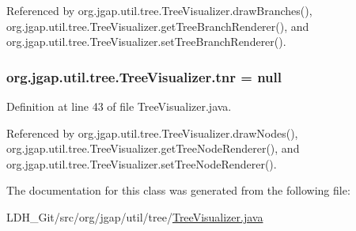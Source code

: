 Referenced by org.\-jgap.\-util.\-tree.\-Tree\-Visualizer.\-draw\-Branches(), org.\-jgap.\-util.\-tree.\-Tree\-Visualizer.\-get\-Tree\-Branch\-Renderer(), and org.\-jgap.\-util.\-tree.\-Tree\-Visualizer.\-set\-Tree\-Branch\-Renderer().

\hypertarget{classorg_1_1jgap_1_1util_1_1tree_1_1_tree_visualizer_a506cac5d7eb4e280016146f321b921fa}{
\subsubsection[{tnr}]{ org.\-jgap.\-util.\-tree.\-Tree\-Visualizer.\-tnr = null\hspace{0.3cm}{\ttfamily [private]}}}\label{classorg_1_1jgap_1_1util_1_1tree_1_1_tree_visualizer_a506cac5d7eb4e280016146f321b921fa}


Definition at line 43 of file Tree\-Visualizer.\-java.



Referenced by org.\-jgap.\-util.\-tree.\-Tree\-Visualizer.\-draw\-Nodes(), org.\-jgap.\-util.\-tree.\-Tree\-Visualizer.\-get\-Tree\-Node\-Renderer(), and org.\-jgap.\-util.\-tree.\-Tree\-Visualizer.\-set\-Tree\-Node\-Renderer().



The documentation for this class was generated from the following file\-:\begin{DoxyCompactItemize}
\item 
L\-D\-H\-\_\-\-Git/src/org/jgap/util/tree/\hyperlink{_tree_visualizer_8java}{Tree\-Visualizer.\-java}\end{DoxyCompactItemize}
